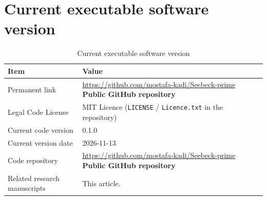 \documentclass[preprint,12pt, a4paper]{elsarticle}
\begin{document}
\section*{Current executable software version}
\label{}

\begin{table}[!h]
\begin{tabular}{|l|p{10.5cm}|}
\hline
\textbf{Item} & \textbf{Value} \\
\hline
Permanent link & \url{https://github.com/mostafa-kadi/Seebeck-prime} \textbf{Public GitHub repository} \\
\hline
Legal Code License & MIT Licence (\texttt{LICENSE} / \texttt{Licence.txt} in the repository) \\
\hline
Current code version & 0.1.0 \\
\hline
Current version date & 2026-11-13 \\
\hline
Code repository & \url{https://github.com/mostafa-kadi/Seebeck-prime} \textbf{Public GitHub repository} \\
\hline
Related research manuscripts & This article. \\
\hline
\end{tabular}
\caption{Current executable software version}
\label{}
\end{table}
\end{document}
